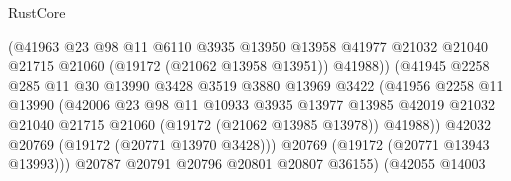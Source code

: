 \begin{lexlean}{RustCore}
\begin{coremodule}
                                    (@41963
                                      @23
                                      @98
                                      @11
                                      @6110
                                      @3935
                                      @13950
                                      @13958
                                      @41977
                                      @21032
                                      @21040
                                      @21715
                                      @21060
                                      (@19172 (@21062 @13958 @13951))
                                      @41988))
                                  (@41945
                                    @2258
                                    @285
                                    @11
                                    @30
                                    @13990
                                    @3428
                                    @3519
                                    @3880
                                    @13969
                                    @3422
                                    (@41956
                                      @2258
                                      @11
                                      @13990
                                      (@42006
                                        @23
                                        @98
                                        @11
                                        @10933
                                        @3935
                                        @13977
                                        @13985
                                        @42019
                                        @21032
                                        @21040
                                        @21715
                                        @21060
                                        (@19172 (@21062 @13985 @13978))
                                        @41988))
                                    @42032
                                    @20769
                                    (@19172 (@20771 @13970 @3428)))
                                  @20769
                                  (@19172 (@20771 @13943 @13993)))
                                @20787
                                @20791
                                @20796
                                @20801
                                @20807
                                @36155)
                              (@42055
                                @14003

\end{coremodule}
\end{lexlean}

